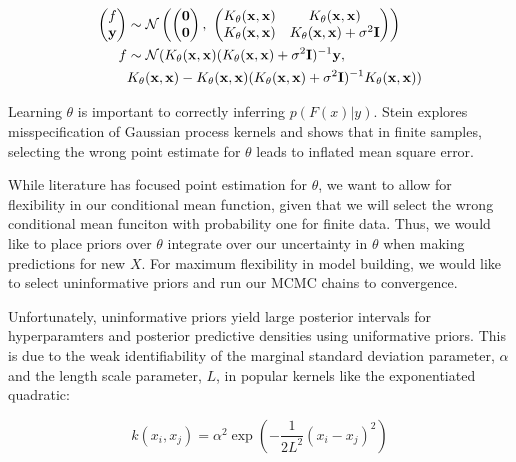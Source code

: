 \documentclass{article}
\newcommand{\lp}{\ensuremath{\left(}}
\newcommand{\rp}{\ensuremath{\right)}}
\begin{document}
\begin{align*}
      \begin{pmatrix} f\\ \mathbf{y} \\ \end{pmatrix} & \sim \mathcal{N} \lp
\begin{pmatrix} \mathbf{0} \\ \mathbf{0} \end{pmatrix} ,\,\, \begin{pmatrix}
  K_\theta(\mathbf{x},\mathbf{x}) & K_\theta(\mathbf{x},\mathbf{x})  \\
  K_\theta(\mathbf{x},\mathbf{x}) &  K_\theta(\mathbf{x},\mathbf{x}) + \sigma ^
  2 \mathbf{I}\\ \end{pmatrix} \rp \\ f & \sim
  \mathcal{N}(K_\theta(\mathbf{x},\mathbf{x})(K_\theta(\mathbf{x},\mathbf{x}) +
  \sigma ^ 2 \mathbf{I})^{-1}\mathbf{y},\\ & K_\theta(\mathbf{x},\mathbf{x}) -
  K_\theta(\mathbf{x},\mathbf{x}) (K_\theta(\mathbf{x},\mathbf{x}) + \sigma ^ 2 \mathbf{I})^{-1}K_\theta(\mathbf{x},\mathbf{x}))
\end{align*}

Learning $\theta$ is important to correctly inferring $p(F(x) | y)$. Stein
explores misspecification of Gaussian process kernels and shows that in finite
samples, selecting the wrong point estimate for $\theta$ leads to inflated mean
square error. 

While literature has focused point estimation for $\theta$, we want to allow
for flexibility in our conditional mean function, given that we will select the
wrong conditional mean funciton with probability one for finite data. Thus, we
would like to place priors over $\theta$ integrate over our uncertainty in
$\theta$ when making predictions for new $X$. For maximum flexibility in
model building, we would like to select uninformative priors and run
our MCMC chains to convergence.

Unfortunately, uninformative priors yield large posterior intervals for
hyperparamters and posterior predictive densities using uniformative priors.
This is due to the weak identifiability of the marginal standard deviation
parameter, $\alpha$ and the length scale parameter, $L$, in popular kernels like the
exponentiated quadratic:

\[
  k(x_i, x_j) = \alpha^2 
\exp \left(
	- \dfrac{1}{2L^2} (x_{i} - x_{j})^2
\right)
\]
\end{document}
